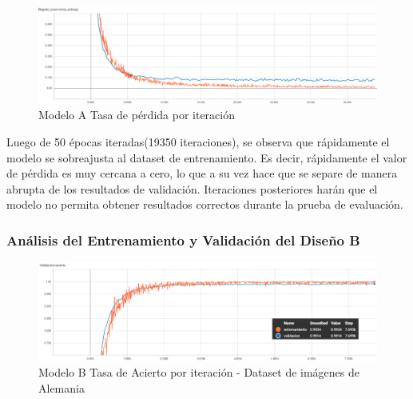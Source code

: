 			\begin{figure}[H]
				\begin{center}
				\includegraphics[width=1\textwidth]{images/desarrollo/trainResults/peru/model0Loss} 
				\end{center}
				\begin{center}
				\caption{\small{Modelo A Tasa de pérdida por iteración}}
				
				{\small{\fontsize{10}{16.8}\selectfont {Fuente: Elaboración propia}}}
				\end{center}
				\vspace{-1.5em}
			\end{figure}

			Luego de 50 épocas iteradas(19350 iteraciones), se observa que rápidamente el modelo se sobreajusta al dataset de entrenamiento. Es decir, rápidamente el valor de pérdida es muy cercana a cero, lo que a su vez hace que se separe de manera abrupta de los resultados de validación. Iteraciones posteriores harán que el modelo no permita obtener resultados correctos durante la prueba de evaluación.


		\subsubsection{Análisis del Entrenamiento y Validación del Diseño B}  
		
			\begin{figure}[H]
				\begin{center}
				\includegraphics[width=1\textwidth]{images/desarrollo/trainResults/peru/model1Acierto} 
				\end{center}
				\begin{center}
				\caption{\small{Modelo B Tasa de Acierto por iteración - Dataset de imágenes de Alemania  }}
				
				{\small{\fontsize{10}{16.8}\selectfont {Fuente: Elaboración propia}}}
				\end{center}
				\vspace{-1.5em}
			\end{figure}
		
